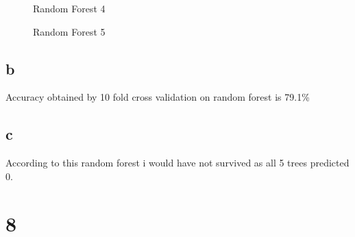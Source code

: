 \documentclass{article}
\begin{document}
\begin{center}
\begin{figure}
    \caption{Random Forest 4}
\end{figure}
\begin{figure}
    \caption{Random Forest 5}
\end{figure}
\end{center}
\subsection{b}
Accuracy obtained by 10 fold cross validation on random forest is 79.1\%
\subsection{c}
According to this random forest i would have not survived as all 5 trees predicted 0.

\section{8}
\end{document}
